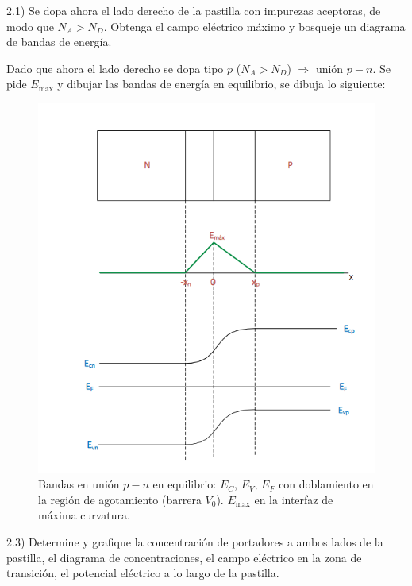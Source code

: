 \begin{tcolorbox}
    {\color{blue}
2.1) Se dopa ahora el lado derecho de la pastilla con impurezas aceptoras, de modo que \(N_A>N_D\). Obtenga el campo eléctrico máximo y bosqueje un diagrama de bandas de energía.}
\end{tcolorbox}

Dado que ahora el lado derecho se dopa tipo \(p\) (\(N_A>N_D\)) \(\Rightarrow\) unión \(p\!-\!n\). Se pide \(E_{\max}\) y dibujar las bandas de energía en equilibrio, se dibuja lo siguiente:
\begin{figure}
    \centering
    \includegraphics[scale=0.8]{img/P1_5.png}
    \caption{Bandas en unión \(p\!-\!n\) en equilibrio: \(E_C\), \(E_V\), \(E_F\) con doblamiento en la región de agotamiento (barrera \(V_0\)). \(E_{\max}\) en la interfaz de máxima curvatura.}
\end{figure}

\begin{tcolorbox}
{\color{blue}
2.3) Determine y grafique la concentración de portadores a ambos lados de la pastilla, el diagrama de concentraciones, el campo eléctrico en la zona de transición, el potencial eléctrico a lo largo de la pastilla.}
\end{tcolorbox}


